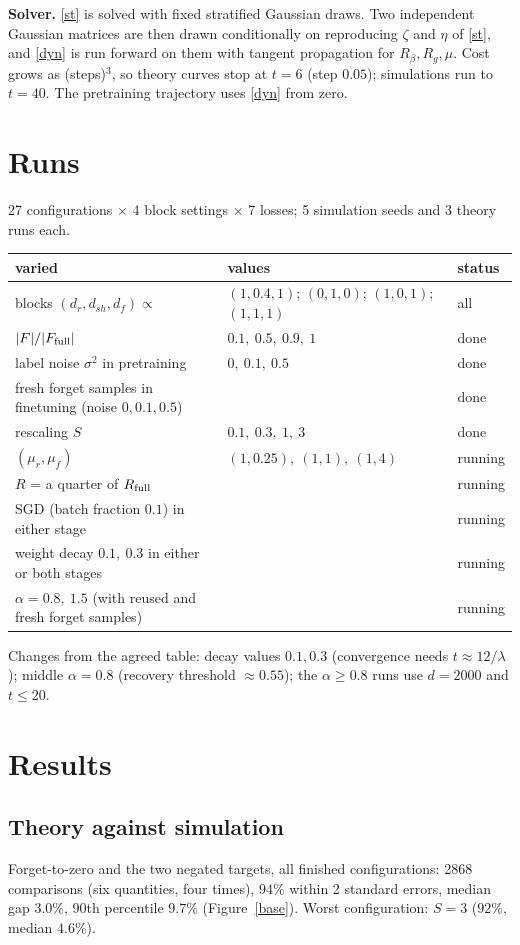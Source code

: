 \documentclass[10pt]{article}
\begin{document}
\textbf{Solver.} \eqref{st} is solved with fixed stratified Gaussian draws. Two independent Gaussian matrices are then drawn conditionally on reproducing $\zeta$ and $\eta$ of \eqref{st}, and \eqref{dyn} is run forward on them with tangent propagation for $R_\beta,R_g,\mu$. Cost grows as (steps)$^3$, so theory curves stop at $t=6$ (step $0.05$); simulations run to $t=40$. The pretraining trajectory uses \eqref{dyn} from zero.

\section{Runs}
27 configurations $\times$ 4 block settings $\times$ 7 losses; 5 simulation seeds and 3 theory runs each.
\begin{center}\small\begin{tabular}{@{}lll@{}}\toprule
varied & values & status\\\midrule
blocks $(d_r,d_{sh},d_f)\propto$ & $(1,0.4,1)$; $(0,1,0)$; $(1,0,1)$; $(1,1,1)$ & all\\
$|F|/|F_{\rm full}|$ & $0.1,\ 0.5,\ 0.9,\ 1$ & done\\
label noise $\sigma^2$ in pretraining & $0,\ 0.1,\ 0.5$ & done\\
fresh forget samples in finetuning (noise $0,0.1,0.5$) & & done\\
rescaling $S$ & $0.1,\ 0.3,\ 1,\ 3$ & done\\
$(\mu_r,\mu_f)$ & $(1,0.25),\ (1,1),\ (1,4)$ & running\\
$R$ = a quarter of $R_{\rm full}$ & & running\\
SGD (batch fraction $0.1$) in either stage & & running\\
weight decay $0.1,\ 0.3$ in either or both stages & & running\\
$\alpha=0.8,\ 1.5$ (with reused and fresh forget samples) & & running\\\bottomrule
\end{tabular}\end{center}
Changes from the agreed table: decay values $0.1,0.3$ (convergence needs $t\approx12/\lambda$); middle $\alpha=0.8$ (recovery threshold $\approx0.55$); the $\alpha\ge0.8$ runs use $d=2000$ and $t\le20$.

\section{Results}
\subsection{Theory against simulation}
Forget-to-zero and the two negated targets, all finished configurations: 2868 comparisons (six quantities, four times), $94\%$ within 2 standard errors, median gap $3.0\%$, 90th percentile $9.7\%$ (Figure~\ref{base}). Worst configuration: $S=3$ ($92\%$, median $4.6\%$).
\end{document}
